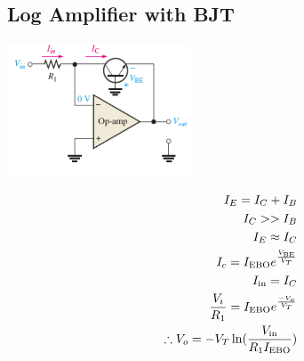 \documentclass[a4paper, 12pt]{report}
\begin{document}
\begin{center}
\begin{center}
\begin{center}
\begin{center}
\begin{center}
\begin{center}
\begin{center}
\begin{center}
\begin{center}
\begin{center}
\begin{center}
\begin{center}
\begin{multicols}{2}
\subsection{Log Amplifier with BJT}
\begin{center}
    \includegraphics[width=0.41\textwidth]{figures/27c.png}
\end{center}
\begin{equation} \notag
    \begin{align}
        I_E = I_C + I_B\\
        I_C >> I_B\\
        I_E \approx I_C\\
        I_c  = I_\text{EBO} e^{\frac{V_\text{BE}}{V_T}}\\
        I_\text{in} = I_C\\
        \frac{V_i}{R_1} = I_\text{EBO}e^{\frac{-V_o}{V_T}}\\
    \therefore V_o = -V_T \ln(\frac{V_\text{in}}{R_1I_\text{EBO}})
    \end{align}
\end{equation}
\end{multicols}

\end{center}
\end{center}
\end{center}
\end{center}
\end{center}
\end{center}
\end{center}
\end{center}
\end{center}
\end{center}
\end{center}
\end{center}
\end{document}

